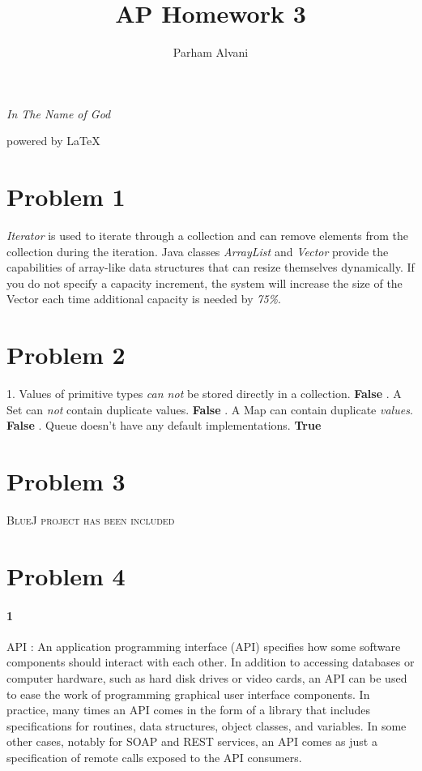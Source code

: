 \documentclass{article}
\author{Parham Alvani}
\title{AP Homework 3}
\begin{document}
\begin{titlepage}
\begin{center}
\emph{In The Name of God}
\end{center}
\newpage
\maketitle
\begin{center}
powered by \LaTeX
\end{center}
\end{titlepage}
\tableofcontents
\newpage
\section{Problem 1}
\textit{Iterator} is used to iterate through a collection and can remove elements from the
collection during the iteration.
\newline
Java classes \textit{ArrayList} and \textit{Vector} provide the capabilities of array-like data structures
that can resize themselves dynamically.
\newline
If you do not specify a capacity increment, the system will increase the size of the Vector each
time additional capacity is needed by \textit{75\%}.
\section{Problem 2}
1. Values of primitive types \textit{can not} be stored directly in a collection. \textbf{False}
. A Set can \textit{not} contain duplicate values. \textbf{False}
. A Map can contain duplicate \textit{values}. \textbf{False}
. Queue doesn't have any default implementations. \textbf{True}
\section{Problem 3}
\textsc{BlueJ project has been included}
\section{Problem 4}
\paragraph{1}
API : An application programming interface (API) specifies how some software components should interact with each other.
In addition to accessing databases or computer hardware, such as hard disk drives or video cards, an API can be used to ease the work of programming graphical user interface components. In practice, many times an API comes in the form of a library that includes specifications for routines, data structures, object classes, and variables. In some other cases, notably for SOAP and REST services, an API comes as just a specification of remote calls exposed to the API consumers.
\end{document}
